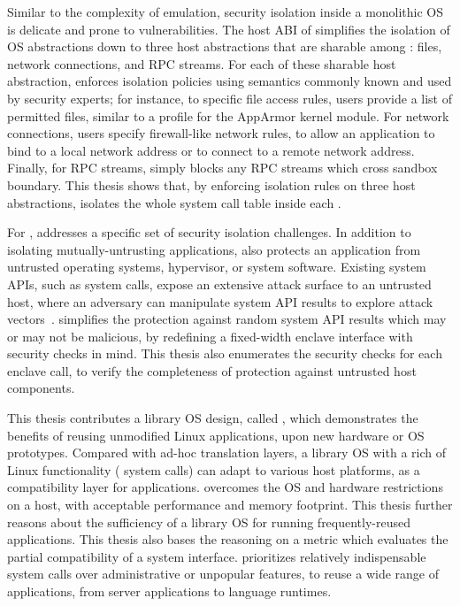 Similar to the complexity of emulation,
security isolation inside a monolithic OS is delicate and prone to vulnerabilities.
The host ABI of \graphene{} simplifies
the isolation of OS abstractions
down to three host abstractions that are sharable among \picoprocs{}: files, network connections, and RPC streams.
For each of these sharable host abstraction, \graphene{} enforces isolation policies using semantics
commonly known and used by security experts;
for instance, to specific file access rules, users provide a list of permitted files, similar to a profile for the AppArmor kernel module.
For network connections,
users specify firewall-like network rules,
to allow an application
to bind to a local network address or to connect to a remote network address.
Finally, for RPC streams,
\graphene{} simply blocks any RPC streams
which cross sandbox boundary.
This thesis shows that,
by enforcing isolation rules on three host abstractions,
\thehostabi{} isolates the whole system call table inside each \picoproc{}.



For \sgx{}, \graphene{} addresses a specific set of security isolation challenges.
In addition to isolating mutually-untrusting applications,
\graphene{} also protects an \sgx{} application
from untrusted operating systems, hypervisor, or system software.
Existing system APIs, such as system calls, expose an extensive attack surface
to an untrusted host, where an adversary
can manipulate system API results to explore attack vectors~\cite{checkoway13iago}.
\graphene{} simplifies
the protection against random system API results which may or may not be malicious,
by redefining a fixed-width enclave interface
with security checks in mind.
This thesis also enumerates the security checks for each enclave call,
to verify the completeness
of protection against untrusted host components.










This thesis contributes a library OS design, called \graphene{},
which demonstrates the benefits of reusing unmodified Linux applications, upon new hardware or OS prototypes.
Compared with ad-hoc translation layers,
a library OS with a rich of Linux functionality (\graphenesyscallnum{} system calls) can adapt to various host platforms, as a compatibility layer for applications.
\graphene{} overcomes the OS and hardware restrictions on a host, with acceptable performance and memory footprint.
This thesis further reasons about the sufficiency of a library OS
for running frequently-reused applications. This thesis also bases the reasoning on a metric which evaluates the partial compatibility of a system interface.
\graphene{} prioritizes relatively indispensable system calls over administrative or unpopular features,
to reuse a wide range of applications, from server applications to language runtimes.


